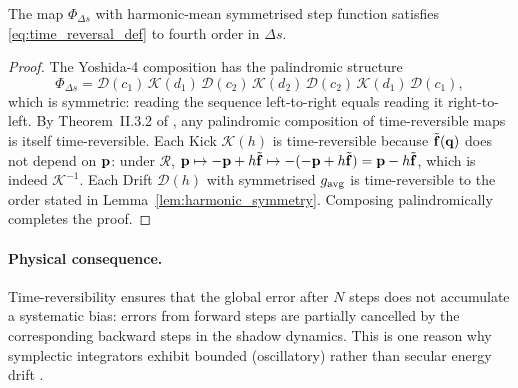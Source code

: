 \begin{theorem}
The map $\Phi_{\Delta s}$ with harmonic-mean symmetrised
step function satisfies \eqref{eq:time_reversal_def} to
fourth order in $\Delta s$.
\end{theorem}

\begin{proof}
The Yoshida-4 composition has the palindromic structure
\begin{equation}
  \Phi_{\Delta s}
  = \mathcal{D}(c_1)\,\mathcal{K}(d_1)\,\mathcal{D}(c_2)\,
    \mathcal{K}(d_2)\,\mathcal{D}(c_2)\,\mathcal{K}(d_1)\,\mathcal{D}(c_1),
\end{equation}
which is symmetric: reading the sequence left-to-right equals
reading it right-to-left. By Theorem~II.3.2 of
\citet{HairerLubichWanner2006}, any palindromic composition of
time-reversible maps is itself time-reversible.
Each Kick $\mathcal{K}(h)$ is time-reversible because
$\tilde{\mathbf{f}}(\mathbf{q})$ does not depend on $\mathbf{p}$:
under $\mathcal{R}$, $\mathbf{p} \mapsto -\mathbf{p} + h\tilde{\mathbf{f}} \mapsto
-(-\mathbf{p} + h\tilde{\mathbf{f}}) = \mathbf{p} - h\tilde{\mathbf{f}}$,
which is indeed $\mathcal{K}^{-1}$.
Each Drift $\mathcal{D}(h)$ with symmetrised $g_{\rm avg}$
is time-reversible to the order stated in
Lemma~\ref{lem:harmonic_symmetry}.
Composing palindromically completes the proof.
\end{proof}

\paragraph{Physical consequence.}
Time-reversibility ensures that the global error after $N$ steps
does not accumulate a systematic bias: errors from forward steps
are partially cancelled by the corresponding backward steps in
the shadow dynamics. This is one reason why symplectic integrators
exhibit bounded (oscillatory) rather than secular energy drift
\citep{HairerLubichWanner2006}.
